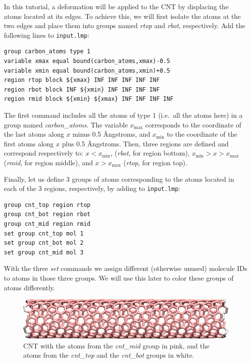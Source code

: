\documentclass[9pt,tutorial]{livecoms}
\newcommand{\flecmd}[1]{\textcolor{command}{\texttt{#1}}} %
\begin{document}
In this tutorial, a deformation will be applied to the CNT by displacing
the atoms located at its edges. To achieve this, we will first isolate the
atoms at the two edges and place them into groups named \textit{rtop} and
\textit{rbot}, respectively. Add the following lines to \flecmd{input.lmp}:
\begin{lstlisting}
group carbon_atoms type 1
variable xmax equal bound(carbon_atoms,xmax)-0.5
variable xmin equal bound(carbon_atoms,xmin)+0.5
region rtop block ${xmax} INF INF INF INF INF
region rbot block INF ${xmin} INF INF INF INF
region rmid block ${xmin} ${xmax} INF INF INF INF
\end{lstlisting}
The first command includes all the atoms of type 1 (i.e.~all the atoms here)
in a group named \textit{carbon\_atoms}.
The variable $x_\text{max}$ corresponds to the coordinate of the
last atoms along $x$ minus 0.5 Ångstroms, and $x_\text{min}$ to the coordinate
of the first atoms along $x$ plus 0.5 Ångstroms. Then, three regions are defined
and correspond respectively to: $x < x_\text{min}$, (\textit{rbot}, for region
bottom), $x_\text{min} > x > x_\text{max}$ (\textit{rmid}, for region middle),
and $x > x_\text{max}$ (\textit{rtop}, for region top).

Finally, let us define 3 groups of atoms corresponding to the atoms located
in each of the 3 regions, respectively, by adding to \flecmd{input.lmp}:
\begin{lstlisting}
group cnt_top region rtop
group cnt_bot region rbot
group cnt_mid region rmid
set group cnt_top mol 1
set group cnt_bot mol 2
set group cnt_mid mol 3
\end{lstlisting}
With the three \textit{set} commands we assign different (otherwise unused)
molecule IDs to atoms in those three groups.  We will use this later to
color these groups of atoms differently.

\begin{figure}
\centering
\includegraphics[width=\linewidth]{CNT-underformed}
\caption{CNT with the atoms from the \textit{cnt\_mid} group in pink,
and the atoms from the \textit{cnt\_top} and the \textit{cnt\_bot}
groups in white.}
\label{fig:CNT-underformed}
\end{figure}
\end{document}
